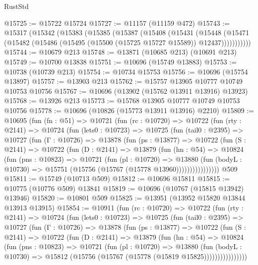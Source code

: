 \begin{lexlean}{RustStd}
\begin{coremodule}
@15725 := @15722 @15724
@15727 := @11157 (@11159 @472)
@15743 := @15317
    (@15342
      (@15383
        (@15385
          (@15387
            (@15408
              (@15431
                (@15448
                  (@15471 (@15482 (@15486 (@15495 (@15500 (@15725 @15727 @15589)) @12437)))))))))))
@15744 := @10679 @213
@15748 := @13871 (@10685 @213) (@10691 @213)
@15749 := @10700 @13838
@15751 := @10696 (@15749 @13883)
@15753 := @10738 (@10739 @213)
@15754 := @10734 @15753
@15756 := @10696 (@15754 @13897)
@15757 := @13903 @213
@15762 := @15757 @13905 @10777 @10749 @10753 @10756
@15767 := @10696 (@13902 (@15762 @13911 @13916) @13923)
@15768 := @13926 @213
@15773 := @15768 @13905 @10777 @10749 @10753 @10756
@15778 := @10696 (@10826 (@15773 @13911 @13916) @2210)
@15809 := @10695
    (fun (fn : @51) =>
    @10721
      (fun (rc : @10720) =>
      @10722
        (fun (rty : @2141) =>
        @10724
          (fun (lets0 : @10723) =>
          @10725
            (fun (tail0 : @2395) =>
            @10727
              (fun (Γ : @10726) =>
              @13878
                (fun (ps : @13877) =>
                @10722
                  (fun (S : @2141) =>
                  @10722
                    (fun (D : @2141) =>
                    @13879
                      (fun (hn : @54) =>
                      @10824
                        (fun (pns : @10823) =>
                        @10721
                          (fun (pl : @10720) =>
                          @13880
                            (fun (bodyL : @10730) =>
                            @15751 (@15756 (@15767 (@15778 @13960))))))))))))))))
    @509
@15811 := @15749 (@10713 @509)
@15812 := @10696 @15811
@15815 := @10775 (@10776 @509) @13841
@15819 := @10696 (@10767 (@15815 @13942) @13946)
@15820 := @10801 @509
@15825 := @13951 (@13952 @15820 @13844 @13913 @13915)
@15854 := @10911
    (fun (rc : @10720) =>
    @10722
      (fun (rty : @2141) =>
      @10724
        (fun (lets0 : @10723) =>
        @10725
          (fun (tail0 : @2395) =>
          @10727
            (fun (Γ : @10726) =>
            @13878
              (fun (ps : @13877) =>
              @10722
                (fun (S : @2141) =>
                @10722
                  (fun (D : @2141) =>
                  @13879
                    (fun (hn : @54) =>
                    @10824
                      (fun (pns : @10823) =>
                      @10721
                        (fun (pl : @10720) =>
                        @13880
                          (fun (bodyL : @10730) =>
                          @15812 (@15756 (@15767 (@15778 (@15819 @15825))))))))))))))))

\end{coremodule}
\end{lexlean}

